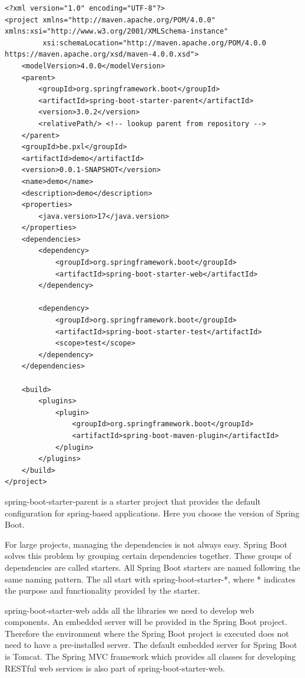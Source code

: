 \begin{lstlisting}[frame=single]
<?xml version="1.0" encoding="UTF-8"?>
<project xmlns="http://maven.apache.org/POM/4.0.0" xmlns:xsi="http://www.w3.org/2001/XMLSchema-instance"
         xsi:schemaLocation="http://maven.apache.org/POM/4.0.0 https://maven.apache.org/xsd/maven-4.0.0.xsd">
    <modelVersion>4.0.0</modelVersion>
    <parent>
        <groupId>org.springframework.boot</groupId>
        <artifactId>spring-boot-starter-parent</artifactId>
        <version>3.0.2</version>
        <relativePath/> <!-- lookup parent from repository -->
    </parent>
    <groupId>be.pxl</groupId>
    <artifactId>demo</artifactId>
    <version>0.0.1-SNAPSHOT</version>
    <name>demo</name>
    <description>demo</description>
    <properties>
        <java.version>17</java.version>
    </properties>
    <dependencies>
        <dependency>
            <groupId>org.springframework.boot</groupId>
            <artifactId>spring-boot-starter-web</artifactId>
        </dependency>

        <dependency>
            <groupId>org.springframework.boot</groupId>
            <artifactId>spring-boot-starter-test</artifactId>
            <scope>test</scope>
        </dependency>
    </dependencies>

    <build>
        <plugins>
            <plugin>
                <groupId>org.springframework.boot</groupId>
                <artifactId>spring-boot-maven-plugin</artifactId>
            </plugin>
        </plugins>
    </build>
</project>
\end{lstlisting}

spring-boot-starter-parent is a starter project that provides the default configuration for spring-based applications. Here you choose the version of Spring Boot.

For large projects, managing the dependencies is not always easy. Spring Boot solves this problem by grouping certain dependencies together. These groups of dependencies are called starters. All Spring Boot starters are named following the same naming pattern. The all start with spring-boot-starter-*, where * indicates the purpose and functionality provided by the starter.

spring-boot-starter-web adds all the libraries we need to develop web components. An embedded server will be provided in the Spring Boot project. Therefore the environment where the Spring Boot project is executed does not need to have a pre-installed server. The default embedded server for Spring Boot is Tomcat. The Spring MVC framework which provides all classes for developing RESTful web services is also part of spring-boot-starter-web.

